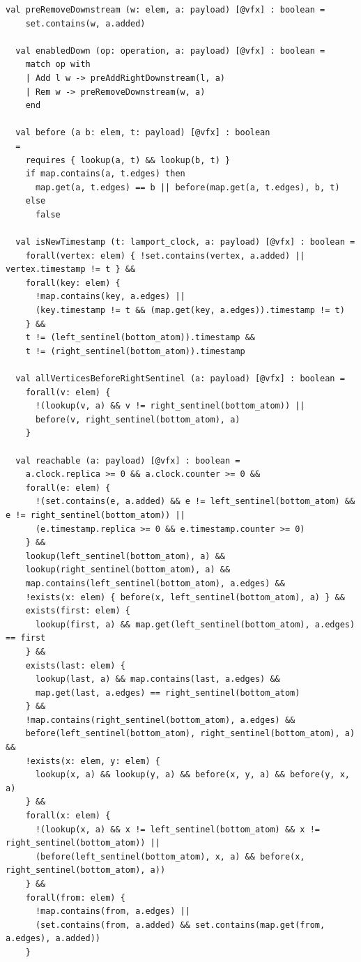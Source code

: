 \begin{lstlisting}[caption={\texttt{RGA}}, label={lst:app_rga}]
  val preRemoveDownstream (w: elem, a: payload) [@vfx] : boolean =
    set.contains(w, a.added)

  val enabledDown (op: operation, a: payload) [@vfx] : boolean =
    match op with
    | Add l w -> preAddRightDownstream(l, a)
    | Rem w -> preRemoveDownstream(w, a)
    end

  val before (a b: elem, t: payload) [@vfx] : boolean
  =
    requires { lookup(a, t) && lookup(b, t) }
    if map.contains(a, t.edges) then
      map.get(a, t.edges) == b || before(map.get(a, t.edges), b, t)
    else
      false

  val isNewTimestamp (t: lamport_clock, a: payload) [@vfx] : boolean =
    forall(vertex: elem) { !set.contains(vertex, a.added) || vertex.timestamp != t } &&
    forall(key: elem) {
      !map.contains(key, a.edges) ||
      (key.timestamp != t && (map.get(key, a.edges)).timestamp != t)
    } &&
    t != (left_sentinel(bottom_atom)).timestamp &&
    t != (right_sentinel(bottom_atom)).timestamp

  val allVerticesBeforeRightSentinel (a: payload) [@vfx] : boolean =
    forall(v: elem) {
      !(lookup(v, a) && v != right_sentinel(bottom_atom)) ||
      before(v, right_sentinel(bottom_atom), a)
    }

  val reachable (a: payload) [@vfx] : boolean =
    a.clock.replica >= 0 && a.clock.counter >= 0 &&
    forall(e: elem) {
      !(set.contains(e, a.added) && e != left_sentinel(bottom_atom) && e != right_sentinel(bottom_atom)) ||
      (e.timestamp.replica >= 0 && e.timestamp.counter >= 0)
    } &&
    lookup(left_sentinel(bottom_atom), a) &&
    lookup(right_sentinel(bottom_atom), a) &&
    map.contains(left_sentinel(bottom_atom), a.edges) &&
    !exists(x: elem) { before(x, left_sentinel(bottom_atom), a) } &&
    exists(first: elem) {
      lookup(first, a) && map.get(left_sentinel(bottom_atom), a.edges) == first
    } &&
    exists(last: elem) {
      lookup(last, a) && map.contains(last, a.edges) &&
      map.get(last, a.edges) == right_sentinel(bottom_atom)
    } &&
    !map.contains(right_sentinel(bottom_atom), a.edges) &&
    before(left_sentinel(bottom_atom), right_sentinel(bottom_atom), a) &&
    !exists(x: elem, y: elem) {
      lookup(x, a) && lookup(y, a) && before(x, y, a) && before(y, x, a)
    } &&
    forall(x: elem) {
      !(lookup(x, a) && x != left_sentinel(bottom_atom) && x != right_sentinel(bottom_atom)) ||
      (before(left_sentinel(bottom_atom), x, a) && before(x, right_sentinel(bottom_atom), a))
    } &&
    forall(from: elem) {
      !map.contains(from, a.edges) ||
      (set.contains(from, a.added) && set.contains(map.get(from, a.edges), a.added))
    }


\end{lstlisting}
